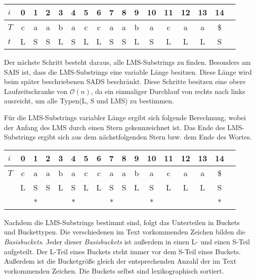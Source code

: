\begin{center}
  \begin{tabular}{ | l | c | c | c | c | c | c | c | c | c | c | c | c | c | c | c | c | }
    \hline
        $i$ & 0 & 1 & 2 & 3 & 4 & 5 & 6 & 7 & 8 & 9 & 10 & 11 & 12 & 13 & 14 \\ \hline
        $T$ & c & a & a & b & a & c & c & a & a & b & a & c & a & a & \$ \\ \hline
        $t$ & L & S & S & L & S & L & L & S & S & L & S & L & L & L & S \\
    \hline
  \end{tabular}
\end{center}
\bigskip
Der nächste Schritt besteht daraus, alle LMS-Substrings zu finden. Besonders am SAIS ist, dass die LMS-Substrings eine variable Länge besitzen. Diese Länge wird beim später beschriebenen SADS beschränkt. Diese Schritte besitzen eine obere Laufzeitschranke von $\mathcal{O}(n)$, da ein einmaliger Durchlauf von rechts nach links ausreicht, um alle Typen(L, S und LMS) zu bestimmen.

\noindent Für die LMS-Substrings variabler Länge ergibt sich folgende Berechnung, wobei der Anfang des LMS durch einen Stern gekennzeichnet ist. Das Ende des LMS-Substrings ergibt sich aus dem nächstfolgenden Stern bzw. dem Ende des Wortes.

\begin{center}
  \begin{tabular}{ | l | c | c | c | c | c | c | c | c | c | c | c | c | c | c | c | c | }
    \hline
        $i$ & 0 & 1 & 2 & 3 & 4 & 5 & 6 & 7 & 8 & 9 & 10 & 11 & 12 & 13 & 14 \\ \hline
        $T$ & c & a & a & b & a & c & c & a & a & b & a & c & a & a & \$ \\ \hline
            & L & S & S & L & S & L & L & S & S & L & S & L & L & L & S \\ \hline
            &   & * &   &   & * &   &   & * &   &   & * &   &   &   & * \\
    \hline
  \end{tabular}
\end{center}
\bigskip
Nachdem die LMS-Substrings bestimmt sind, folgt das Unterteilen in Buckets und Buckettypen. Die verschiedenen im Text vorkommenden Zeichen bilden die  \textit{Basisbuckets}. Jeder dieser  \textit{Basisbuckets} ist außerdem in einen L- und einen S-Teil aufgeteilt. Der L-Teil eines Buckets steht immer vor dem S-Teil eines Buckets. Außerdem ist die Bucketgröße gleich der entsprechenden Anzahl der im Text vorkommenden Zeichen. Die Buckets selbst sind lexikographisch sortiert.

